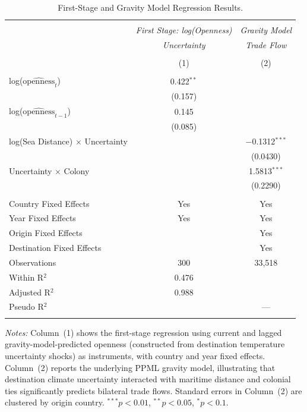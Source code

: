 \documentclass[10pt]{article}
\begin{document}
\begin{table}[!htbp]
  \small
  \centering
  \caption{First-Stage and Gravity Model Regression Results.}
  \label{table:combined_results}
  \begin{tabular}{@{\extracolsep{4pt}}lcc}
  \\[-1.5ex]\hline
  \hline \\[-1.5ex]
  & \textit{First Stage: log(Openness)} & \textit{Gravity Model} \\
  & \textit{Uncertainty} & \textit{Trade Flow} \\
  \\[-1.5ex] & (1) & (2) \\
  \hline \\[-1.5ex]
  log($\widehat{\text{openness}}_{t}$) & 0.422$^{**}$ & \\
  & (0.157) & \\
  log($\widehat{\text{openness}}_{t-1}$) & 0.145 & \\
  & (0.085) & \\
  log(Sea Distance) $\times$ Uncertainty & & $-$0.1312$^{***}$ \\
  & & (0.0430) \\
  Uncertainty $\times$ Colony & & 1.5813$^{***}$ \\
  & & (0.2290) \\
  \hline \\[-1.5ex]
  Country Fixed Effects & Yes & Yes \\
  Year Fixed Effects & Yes & Yes \\
  Origin Fixed Effects & & Yes \\
  Destination Fixed Effects & & Yes \\
  Observations & 300 & 33,518 \\
  Within R$^{2}$ & 0.476 & \\
  Adjusted R$^{2}$ & 0.988 & \\
  Pseudo R$^{2}$ & & --- \\
  \hline
  \hline \\[-1.5ex]
  \end{tabular}
  \begin{minipage}[t]{\textwidth}
  \small
  \textit{Notes:} Column~(1) shows the first-stage regression using current and lagged gravity-model-predicted openness (constructed from destination temperature uncertainty shocks) as instruments, with country and year fixed effects. Column~(2) reports the underlying PPML gravity model, illustrating that destination climate uncertainty interacted with maritime distance and colonial ties significantly predicts bilateral trade flows. Standard errors in Column~(2) are clustered by origin country. $^{***}p<0.01$, $^{**}p<0.05$, $^{*}p<0.1$.
  \end{minipage}
\end{table}
\end{document}
